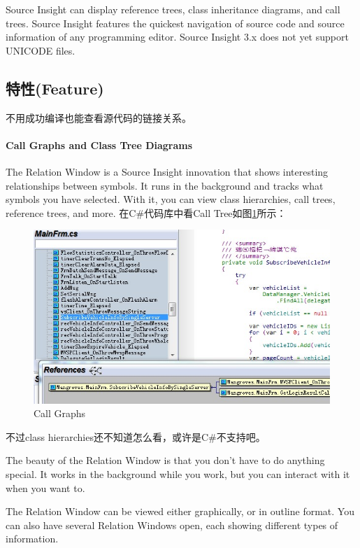 \documentclass{book}
\begin{document}
Source Insight can display reference trees, class inheritance diagrams, 
and call trees. Source Insight features the quickest navigation of source 
code and source information of any programming editor.
Source Insight 3.x does not yet support UNICODE files.

\subsection{特性(Feature)}

不用成功编译也能查看源代码的链接关系。

\paragraph{Call Graphs and Class Tree Diagrams}

The Relation Window is a Source Insight innovation that 
shows interesting relationships between symbols. 
It runs in the background and tracks what symbols you have selected. 
With it, you can view class hierarchies, call trees, reference trees, and more.
在C\#代码库中看Call Tree如图\ref{fig:FunctionTree}所示：

\begin{figure}[htbp]
	\centering
	\includegraphics[scale=0.8]{FunctionTree.jpg}
	\caption{Call Graphs}
	\label{fig:FunctionTree}
\end{figure}

不过class hierarchies还不知道怎么看，或许是C\#不支持吧。

The beauty of the Relation Window is that you don’t have to do anything special. 
It works in the background while you work, 
but you can interact with it when you want to.

The Relation Window can be viewed either graphically, 
or in outline format. You can also have several Relation Windows open, 
each showing different types of information.
\end{document}
